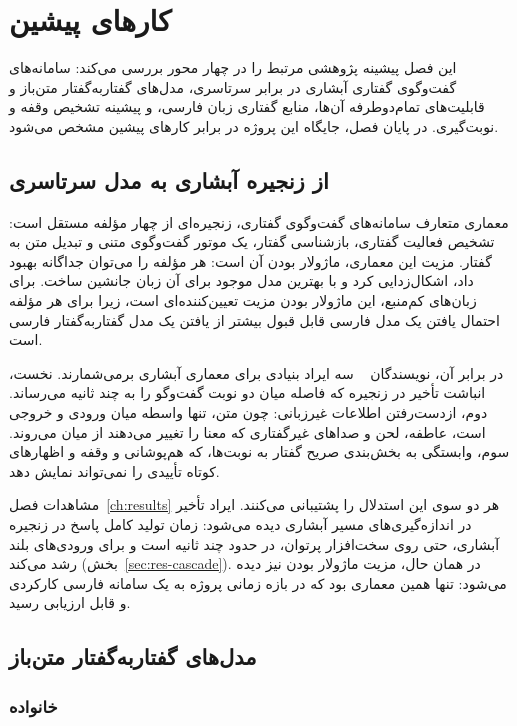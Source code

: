
\chapter{کارهای پیشین}
\label{ch:literature}

این فصل پیشینه پژوهشی مرتبط را در چهار محور بررسی می‌کند: سامانه‌های
گفت‌وگوی گفتاری آبشاری در برابر سرتاسری، مدل‌های گفتار‌به‌گفتار متن‌باز و
قابلیت‌های تمام‌دوطرفه آن‌ها، منابع گفتاری زبان فارسی، و پیشینه تشخیص وقفه و
نوبت‌گیری. در پایان فصل، جایگاه این پروژه در برابر کارهای پیشین مشخص می‌شود.

\section{از زنجیره آبشاری به مدل سرتاسری}
\label{sec:cascade-vs-e2e}

معماری متعارف سامانه‌های گفت‌وگوی گفتاری، زنجیره‌ای از چهار مؤلفه مستقل
است: تشخیص فعالیت گفتاری، بازشناسی گفتار، یک موتور گفت‌وگوی متنی و تبدیل
متن به گفتار. مزیت این معماری، ماژولار بودن آن است: هر مؤلفه را می‌توان
جداگانه بهبود داد، اشکال‌زدایی کرد و با بهترین مدل موجود برای آن زبان
جانشین ساخت. برای زبان‌های کم‌منبع، این ماژولار بودن مزیت تعیین‌کننده‌ای است،
زیرا برای هر مؤلفه احتمال یافتن یک مدل فارسی قابل قبول بیشتر از یافتن یک
مدل گفتار‌به‌گفتار فارسی است.

در برابر آن، نویسندگان ~\cite{defossez2024moshi} سه ایراد بنیادی
برای معماری آبشاری برمی‌شمارند. نخست، انباشت تأخیر در زنجیره که فاصله میان
دو نوبت گفت‌وگو را به چند ثانیه می‌رساند. دوم، از‌دست‌رفتن اطلاعات
غیرزبانی: چون متن، تنها واسطه میان ورودی و خروجی است، عاطفه، لحن و
صداهای غیرگفتاری که معنا را تغییر می‌دهند از میان می‌روند. سوم، وابستگی به
بخش‌بندی صریح گفتار به نوبت‌ها، که هم‌پوشانی و وقفه و اظهارهای کوتاه تأییدی
را نمی‌تواند نمایش دهد.

مشاهدات فصل~\ref{ch:results} هر دو سوی این استدلال را پشتیبانی می‌کنند. ایراد تأخیر در
اندازه‌گیری‌های مسیر آبشاری دیده می‌شود: زمان تولید کامل پاسخ در زنجیره آبشاری، حتی روی
سخت‌افزار پرتوان، در حدود چند ثانیه است و برای ورودی‌های بلند رشد می‌کند
(بخش~\ref{sec:res-cascade}). در همان حال، مزیت ماژولار بودن نیز دیده
می‌شود: تنها همین معماری بود که در بازه زمانی پروژه به یک سامانه فارسی
کارکردی و قابل ارزیابی رسید.

\section{مدل‌های گفتار‌به‌گفتار متن‌باز}
\label{sec:openmodels}

\subsection{خانواده }

